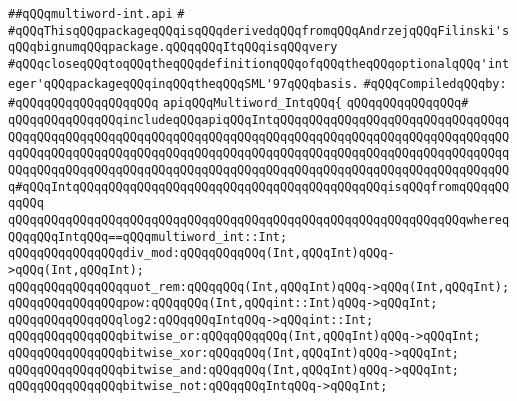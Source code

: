 \label{src/lib/std/src/multiword-int.api}
\verb|##qQQqmultiword-int.api|\newline
\verb|#|\newline
\verb|#qQQqThisqQQqpackageqQQqisqQQqderivedqQQqfromqQQqAndrzejqQQqFilinski'sqQQqbignumqQQqpackage.qQQqqQQqItqQQqisqQQqvery|\newline
\verb|#qQQqcloseqQQqtoqQQqtheqQQqdefinitionqQQqofqQQqtheqQQqoptionalqQQq'integer'qQQqpackageqQQqinqQQqtheqQQqSML'97qQQqbasis.|\newline
\newline
\verb|#qQQqCompiledqQQqby:|\newline
\verb|#qQQqqQQqqQQqqQQqqQQq|\newline
\newline
\newline
\verb|apiqQQqMultiword_IntqQQq{|\newline
\verb|qQQqqQQqqQQqqQQq#|\newline
\verb|qQQqqQQqqQQqqQQqincludeqQQqapiqQQqIntqQQqqQQqqQQqqQQqqQQqqQQqqQQqqQQqqQQqqQQqqQQqqQQqqQQqqQQqqQQqqQQqqQQqqQQqqQQqqQQqqQQqqQQqqQQqqQQqqQQqqQQqqQQqqQQqqQQqqQQqqQQqqQQqqQQqqQQqqQQqqQQqqQQqqQQqqQQqqQQqqQQqqQQqqQQqqQQqqQQqqQQqqQQqqQQqqQQqqQQqqQQqqQQqqQQqqQQqqQQqqQQqqQQqqQQqqQQqqQQqqQQq#qQQqIntqQQqqQQqqQQqqQQqqQQqqQQqqQQqqQQqqQQqqQQqqQQqisqQQqfromqQQqqQQqqQQq|\newline
\verb|qQQqqQQqqQQqqQQqqQQqqQQqqQQqqQQqqQQqqQQqqQQqqQQqqQQqqQQqqQQqqQQqwhereqQQqqQQqIntqQQq==qQQqmultiword_int::Int;|\newline
\newline
\verb|qQQqqQQqqQQqqQQqdiv_mod:qQQqqQQqqQQq(Int,qQQqInt)qQQq->qQQq(Int,qQQqInt);|\newline
\verb|qQQqqQQqqQQqqQQqquot_rem:qQQqqQQq(Int,qQQqInt)qQQq->qQQq(Int,qQQqInt);|\newline
\verb|qQQqqQQqqQQqqQQqpow:qQQqqQQq(Int,qQQqint::Int)qQQq->qQQqInt;|\newline
\verb|qQQqqQQqqQQqqQQqlog2:qQQqqQQqIntqQQq->qQQqint::Int;|\newline
\verb|qQQqqQQqqQQqqQQqbitwise_or:qQQqqQQqqQQq(Int,qQQqInt)qQQq->qQQqInt;|\newline
\verb|qQQqqQQqqQQqqQQqbitwise_xor:qQQqqQQq(Int,qQQqInt)qQQq->qQQqInt;|\newline
\verb|qQQqqQQqqQQqqQQqbitwise_and:qQQqqQQq(Int,qQQqInt)qQQq->qQQqInt;|\newline
\verb|qQQqqQQqqQQqqQQqbitwise_not:qQQqqQQqIntqQQq->qQQqInt;|\newline
